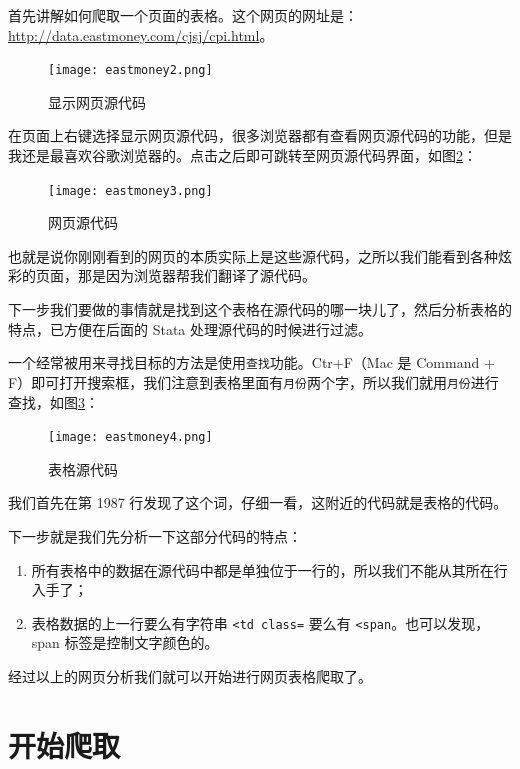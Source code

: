 \documentclass[cn,fancy,blue,11pt]{elegantbook}
\begin{document}
首先讲解如何爬取一个页面的表格。这个网页的网址是：\url{http://data.eastmoney.com/cjsj/cpi.html}。

\begin{figure}
  \centering
  \texttt{[image: eastmoney2.png]}
  \caption{显示网页源代码}
  \label{fig:eastmoney2}
\end{figure}

在页面上右键选择显示网页源代码，很多浏览器都有查看网页源代码的功能，但是我还是最喜欢谷歌浏览器的。点击之后即可跳转至网页源代码界面，如图\ref{fig:eastmoney3}：

\begin{figure}
  \centering
  \texttt{[image: eastmoney3.png]}
  \caption{网页源代码}
  \label{fig:eastmoney3}
\end{figure}

也就是说你刚刚看到的网页的本质实际上是这些源代码，之所以我们能看到各种炫彩的页面，那是因为浏览器帮我们翻译了源代码。

下一步我们要做的事情就是找到这个表格在源代码的哪一块儿了，然后分析表格的特点，已方便在后面的 Stata 处理源代码的时候进行过滤。

一个经常被用来寻找目标的方法是使用\lstinline{查找}功能。Ctr+F（Mac 是 Command + F）即可打开搜索框，我们注意到表格里面有\lstinline{月份}两个字，所以我们就用\lstinline{月份}进行查找，如图\ref{fig:eastmoney4}：

\begin{figure}
  \centering
  \texttt{[image: eastmoney4.png]}
  \caption{表格源代码}
  \label{fig:eastmoney4}
\end{figure}

我们首先在第 1987 行发现了这个词，仔细一看，这附近的代码就是表格的代码。

下一步就是我们先分析一下这部分代码的特点：
\begin{enumerate}
  \item 所有表格中的数据在源代码中都是单独位于一行的，所以我们不能从其所在行入手了；
  \item 表格数据的上一行要么有字符串 \lstinline{<td class=} 要么有 \lstinline{<span}。也可以发现，span 标签是控制文字颜色的。
\end{enumerate}

经过以上的网页分析我们就可以开始进行网页表格爬取了。

\hypertarget{section-31}{%
\section{开始爬取}\label{section-31}}
\end{document}
